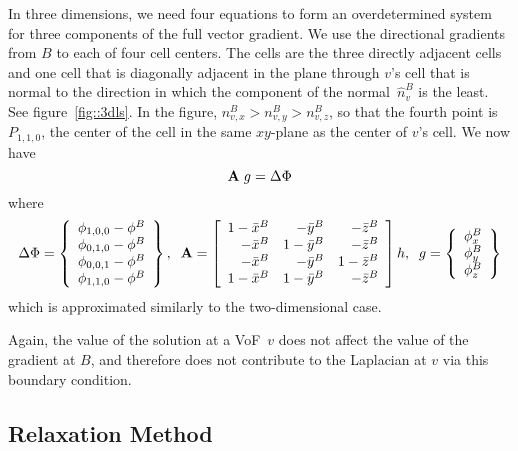  In three dimensions, we need four equations to form an overdetermined
 system for three components of the full vector gradient.  We use the
 directional gradients from $B$ to each of four cell centers.  The
 cells are the three directly adjacent cells and one cell that is
 diagonally adjacent in the plane through $v$'s cell that is normal to the
 direction in which the component of the normal~$\widehat{n}^B_v$ is
 the least.  See figure~\ref{fig::3dls}.  In the figure, $n^B_{v,x} >
 n^B_{v,y} > n^B_{v,z}$, so that the fourth point is $P_{1,1,0}$, the
 center of the cell in the same $xy$-plane as the center of $v$'s cell.
 We now have
 \begin{equation}
 {\rm\bf A} \; {\boldmath g} = {\boldmath \Delta \Phi}
 \label{eqn::4e3u}
 \end{equation}
 where
 \begin{equation}
 {\boldmath \Delta \Phi} = \left\{ \begin{array}{c}
 \phi_{1,0,0} - \phi^B \\
 \phi_{0,1,0} - \phi^B \\
 \phi_{0,0,1} - \phi^B \\
 \phi_{1,1,0} - \phi^B 
 \end{array} \right\}
 , \;\;
 {\rm \bf A} = \left[ \begin{array}{rrr}
 1 - \bar{x}^B  &    - \bar{y}^B &    - \bar{z}^B \\
   - \bar{x}^B  &  1 - \bar{y}^B &    - \bar{z}^B \\
   - \bar{x}^B  &    - \bar{y}^B &  1 - \bar{z}^B \\
 1 - \bar{x}^B  &  1 - \bar{y}^B &    - \bar{z}^B 
 \end{array} \right] h
 , \;\;
 {\boldmath g} = \left\{ \begin{array}{c}
 \phi^B_x \\
 \phi^B_y \\
 \phi^B_z
 \end{array} \right\}
 \end{equation}
 which is approximated similarly to the two-dimensional case.
 
 Again, the value of the solution at a VoF~$v$ does not affect the
 value of the gradient at $B$, and therefore does not contribute to the
 Laplacian at $v$ via this boundary condition.


\subsection{Relaxation Method}
\label{sec::gsrb}

